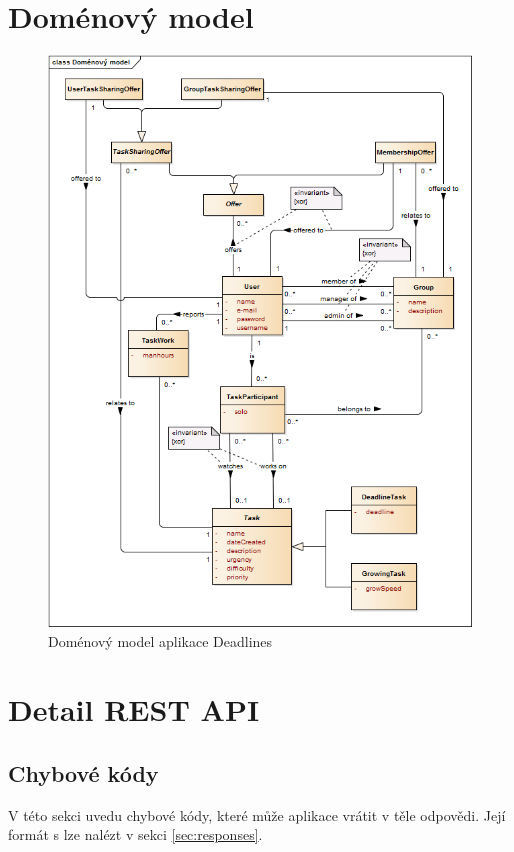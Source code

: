 \documentclass[thesis=B,czech]{FITthesis}[2012/06/26]
\begin{document}
\chapter{Doménový model}
	\begin{figure}\centering
		\includegraphics[width=1\textwidth]{ea-diagrams/domain-model.png}
		\caption[Doménový model]{Doménový model aplikace Deadlines}
		\label{diagram:domain-model}
	\end{figure}

\chapter{Detail REST API}
	\label{appdx:restapi}

	\section{Chybové kódy}
		\label{appdx:rest-error-codes}
		V této sekci uvedu chybové kódy, které může aplikace vrátit v těle odpovědi. Její formát s lze nalézt v sekci \ref{sec:responses}.
		
\end{document}
